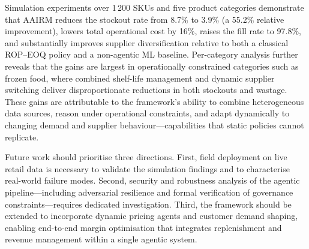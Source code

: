 \documentclass[utf8]{FrontiersinHarvard}
\begin{document}
	Simulation experiments over 1\,200 SKUs and five product categories
	demonstrate that AAIRM reduces the stockout rate from 8.7\% to 3.9\%
	(a 55.2\% relative improvement), lowers total operational cost by 16\%,
	raises the fill rate to 97.8\%, and substantially improves supplier
	diversification relative to both a classical ROP--EOQ policy and a
	non-agentic ML baseline.  Per-category analysis further reveals that the
	gains are largest in operationally constrained categories such as frozen
	food, where combined shelf-life management and dynamic supplier switching
	deliver disproportionate reductions in both stockouts and wastage.  These
	gains are attributable to the framework's ability to combine heterogeneous
	data sources, reason under operational constraints, and adapt dynamically
	to changing demand and supplier behaviour---capabilities that static
	policies cannot replicate.

	Future work should prioritise three directions.  First, field deployment on
	live retail data is necessary to validate the simulation findings and to
	characterise real-world failure modes.  Second, security and robustness
	analysis of the agentic pipeline---including adversarial resilience and
	formal verification of governance constraints---requires dedicated
	investigation.  Third, the framework should be extended to incorporate
	dynamic pricing agents and customer demand shaping, enabling end-to-end
	margin optimisation that integrates replenishment and revenue management
	within a single agentic system.
\end{document}

